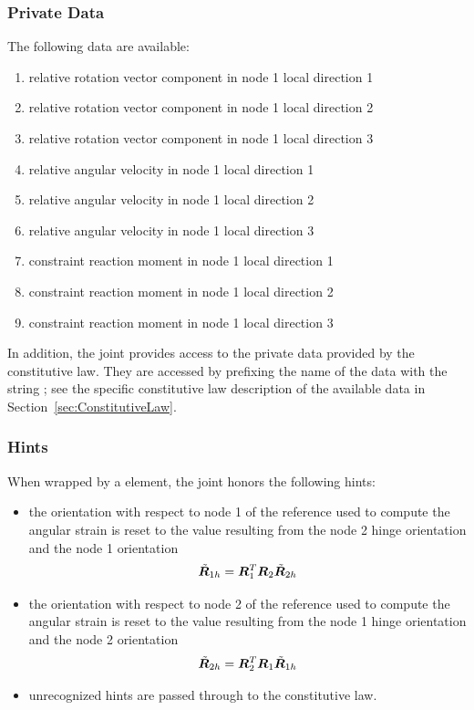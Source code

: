 \subsubsection{Private Data}
The following data are available:
\begin{enumerate}
\item {} relative rotation vector component in node 1 local direction 1
\item {} relative rotation vector component in node 1 local direction 2
\item {} relative rotation vector component in node 1 local direction 3
\item {} relative angular velocity in node 1 local direction 1
\item {} relative angular velocity in node 1 local direction 2
\item {} relative angular velocity in node 1 local direction 3
\item {} constraint reaction moment in node 1 local direction 1
\item {} constraint reaction moment in node 1 local direction 2
\item {} constraint reaction moment in node 1 local direction 3
\end{enumerate}
In addition, the joint provides
access to the private data provided by the constitutive law.
They are accessed by prefixing the name of the data with the string
; see the specific constitutive law
description of the available data in Section~\ref{sec:ConstitutiveLaw}.

\subsubsection{Hints}
When wrapped by a  element, the 
joint honors the following hints:
\begin{itemize}
\item {} the orientation with respect to node 1
of the reference used to compute the angular strain is reset
to the value resulting from the node 2 hinge orientation
and the node 1 orientation
\begin{displaymath}
	\tilde{\boldsymbol{R}}_{1h} = \boldsymbol{R}_1^T \boldsymbol{R}_2 \tilde{\boldsymbol{R}}_{2h}
\end{displaymath}
\item {} the orientation with respect to node 2
of the reference used to compute the angular strain is reset
to the value resulting from the node 1 hinge orientation
and the node 2 orientation
\begin{displaymath}
	\tilde{\boldsymbol{R}}_{2h} = \boldsymbol{R}_2^T \boldsymbol{R}_1 \tilde{\boldsymbol{R}}_{1h}
\end{displaymath}
\item unrecognized hints are passed through to the constitutive law.
\end{itemize}

